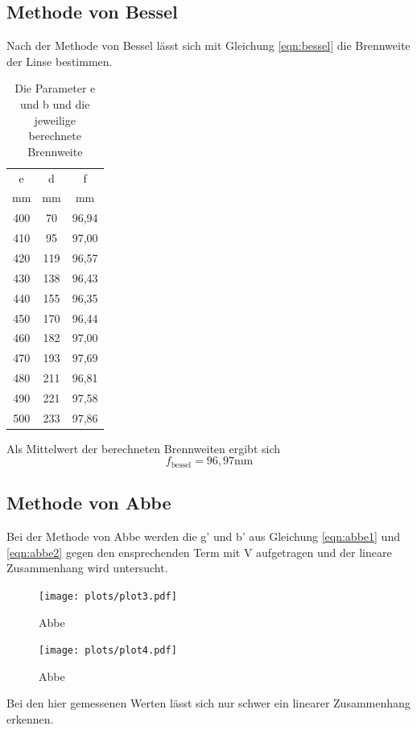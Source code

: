 \subsection{Methode von Bessel}
Nach der Methode von Bessel lässt sich mit Gleichung \ref{eqn:bessel} die Brennweite der Linse bestimmen.
\begin{table}[H]
    \centering
    \begin{tabular}{c c | c }
        \toprule
        e & d & f\\
        mm & mm & mm\\
        \midrule
        400 & 70 & 96,94\\
        410 & 95 & 97,00\\
        420 & 119& 96,57\\
        430 & 138& 96,43\\
        440 & 155& 96,35\\
        450 & 170& 96,44\\
        460 & 182& 97,00\\
        470 & 193& 97,69\\
        480 & 211& 96,81\\
        490 & 221& 97,58\\
        500 & 233& 97,86 \\
        \bottomrule
    \end{tabular}
    \caption{Die Parameter e und b und die jeweilige berechnete Brennweite}
    \label{tab:tab1}
\end{table}
Als Mittelwert der berechneten Brennweiten ergibt sich
\begin{equation}
    f_{\text{bessel}} = 96,97 \text{mm} \nonumber
\end{equation}
\subsection{Methode von Abbe}
Bei der Methode von Abbe werden die g' und b' aus Gleichung \ref{eqn:abbe1} und \ref{eqn:abbe2} gegen den ensprechenden Term mit V aufgetragen und der lineare Zusammenhang wird untersucht.
\begin{figure}[H]
    \centering
    \texttt{[image: plots/plot3.pdf]}
    \caption{Abbe}
\end{figure}
\begin{figure}[H]
    \centering
    \texttt{[image: plots/plot4.pdf]}
    \caption{Abbe}
\end{figure}
Bei den hier gemessenen Werten lässt sich nur schwer ein linearer Zusammenhang erkennen.